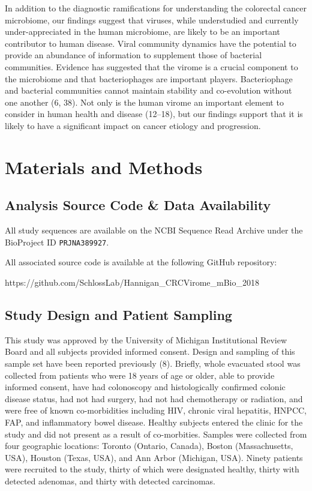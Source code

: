 \documentclass[12pt,]{article}
\begin{document}
In addition to the diagnostic ramifications for understanding the
colorectal cancer microbiome, our findings suggest that viruses, while
understudied and currently under-appreciated in the human microbiome,
are likely to be an important contributor to human disease. Viral
community dynamics have the potential to provide an abundance of
information to supplement those of bacterial communities. Evidence has
suggested that the virome is a crucial component to the microbiome and
that bacteriophages are important players. Bacteriophage and bacterial
communities cannot maintain stability and co-evolution without one
another (6, 38). Not only is the human virome an important element to
consider in human health and disease (12--18), but our findings support
that it is likely to have a significant impact on cancer etiology and
progression.

\section{Materials and Methods}\label{materials-and-methods}

\subsection{Analysis Source Code \& Data
Availability}\label{analysis-source-code-data-availability}

All study sequences are available on the NCBI Sequence Read Archive
under the BioProject ID \texttt{PRJNA389927}.

All associated source code is available at the following GitHub
repository:

https://github.com/SchlossLab/Hannigan\_CRCVirome\_mBio\_2018

\subsection{Study Design and Patient
Sampling}\label{study-design-and-patient-sampling}

This study was approved by the University of Michigan Institutional
Review Board and all subjects provided informed consent. Design and
sampling of this sample set have been reported previously (8). Briefly,
whole evacuated stool was collected from patients who were 18 years of
age or older, able to provide informed consent, have had colonoscopy and
histologically confirmed colonic disease status, had not had surgery,
had not had chemotherapy or radiation, and were free of known
co-morbidities including HIV, chronic viral hepatitis, HNPCC, FAP, and
inflammatory bowel disease. Healthy subjects entered the clinic for the
study and did not present as a result of co-morbities. Samples were
collected from four geographic locations: Toronto (Ontario, Canada),
Boston (Massachusetts, USA), Houston (Texas, USA), and Ann Arbor
(Michigan, USA). Ninety patients were recruited to the study, thirty of
which were designated healthy, thirty with detected adenomas, and thirty
with detected carcinomas.
\end{document}
